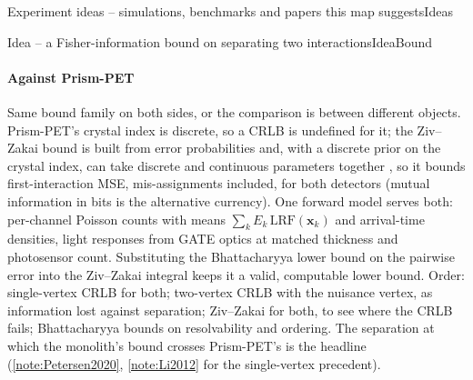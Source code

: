 \begin{programnote}{Experiment ideas -- simulations, benchmarks and papers this map suggests}{Ideas}
\begin{papernote}{Idea -- a Fisher-information bound on separating two interactions}{IdeaBound}
\paragraph{Against Prism-PET}
Same bound family on both sides, or the comparison is between different
objects. Prism-PET's crystal index is discrete, so a CRLB is undefined for it;
the Ziv--Zakai bound is built from error probabilities and, with a discrete
prior on the crystal index, can take discrete and continuous parameters together
, so it bounds first-interaction MSE,
mis-assignments included, for both detectors (mutual information in bits is
the alternative currency). One forward model serves both: per-channel Poisson
counts with means $\sum_k E_k\,\mathrm{LRF}(\mathbf{x}_k)$ and arrival-time
densities, light responses from GATE optics at matched thickness and
photosensor count. Substituting the Bhattacharyya lower bound on the
pairwise error into the Ziv--Zakai integral keeps it a valid, computable
lower bound. Order: single-vertex CRLB for both; two-vertex CRLB with the
nuisance vertex, as information lost against separation; Ziv--Zakai for
both, to see where the CRLB fails; Bhattacharyya bounds on resolvability and
ordering. The separation at which the monolith's bound crosses Prism-PET's is
the headline (\ref{note:Petersen2020}, \ref{note:Li2012} for the
single-vertex precedent).


\end{papernote}
\end{programnote}
